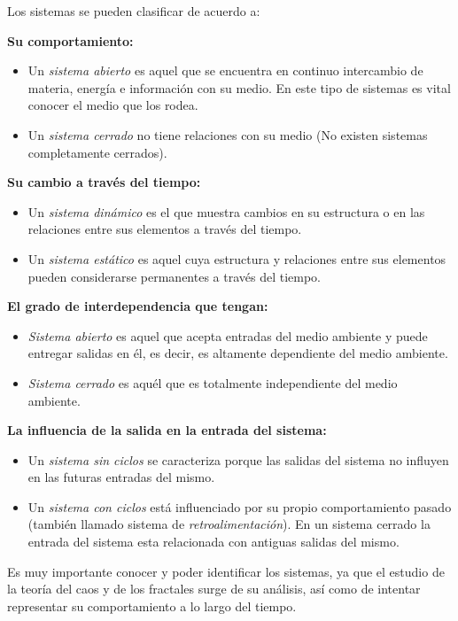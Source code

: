 \documentclass[letterpaper, 11pt, oneside]{article}
\theoremstyle{definition}
\theoremstyle{remark}
\begin{document}
Los sistemas se pueden clasificar de acuerdo a:

{\bf Su comportamiento: \par}
\begin{itemize}
\item Un \textit{sistema abierto} es aquel que se encuentra en continuo intercambio de materia, energía e información con su medio. En este tipo de sistemas es vital conocer el medio que los rodea.
\item Un \textit{sistema cerrado} no tiene relaciones con su medio (No existen sistemas completamente cerrados).
\end{itemize}

{\bf Su cambio a través del tiempo: \par}
\begin{itemize}
\item Un \textit{sistema dinámico} es el que muestra cambios en su estructura o en las relaciones entre sus elementos a través del tiempo.
\item Un \textit{sistema estático} es aquel cuya estructura y relaciones entre sus elementos pueden considerarse permanentes a través del tiempo.
\end{itemize}

{\bf El grado de interdependencia que tengan: \par}
\begin{itemize}
\item \textit{Sistema abierto} es aquel que acepta entradas del medio ambiente y puede entregar salidas en él, es decir, es altamente dependiente del medio ambiente.
\item \textit{Sistema cerrado} es aquél que es totalmente independiente del medio ambiente.
\end{itemize}

{\bf La influencia de la salida en la entrada del sistema: \par}
\begin{itemize}
\item Un \textit{sistema sin ciclos} se caracteriza porque las salidas del sistema no influyen en las futuras entradas del mismo.
\item Un \textit{sistema con ciclos} está influenciado por su propio comportamiento pasado (también llamado sistema de \emph{retroalimentación}). En un sistema cerrado la entrada del sistema esta relacionada con antiguas salidas del mismo.
\end{itemize}

Es muy importante conocer y poder identificar los sistemas, ya que el estudio de la teoría del caos y de los fractales surge de su análisis, así como de intentar representar su comportamiento a lo largo del tiempo.
\end{document}
